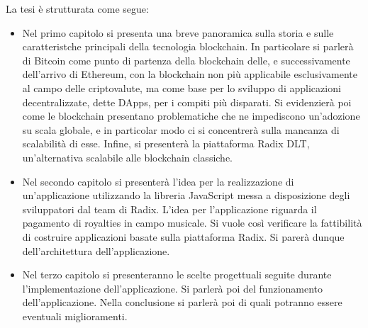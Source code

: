 La tesi è strutturata come segue:
\begin{itemize}

    \item Nel primo capitolo si presenta una breve panoramica sulla storia e sulle caratteristche principali della tecnologia blockchain. In particolare si parlerà di Bitcoin come punto di partenza della blockchain delle, e successivamente dell'arrivo di Ethereum, con la blockchain non più applicabile esclusivamente al campo delle criptovalute, ma come base per lo sviluppo di applicazioni decentralizzate, dette DApps, per i compiti più disparati. Si evidenzierà poi come le blockchain presentano problematiche che ne impediscono un'adozione su scala globale, e in particolar modo ci si concentrerà sulla mancanza di scalabilità di esse. Infine, si presenterà la piattaforma Radix DLT, un'alternativa scalabile alle blockchain classiche.
    
    \item Nel secondo capitolo si presenterà l'idea per la realizzazione di un'applicazione utilizzando la libreria JavaScript messa a disposizione degli sviluppatori dal team di Radix. L'idea per l'applicazione riguarda il pagamento di royalties in campo musicale. Si vuole così verificare la fattibilità di costruire applicazioni basate sulla piattaforma Radix. Si parerà dunque dell'architettura dell'applicazione.
    
    \item Nel terzo capitolo si presenteranno le scelte progettuali seguite durante l'implementazione dell'applicazione. Si parlerà poi del funzionamento dell'applicazione. Nella conclusione si parlerà poi di quali potranno essere eventuali miglioramenti.
    
\end{itemize}

\clearpage{\pagestyle{empty}\cleardoublepage}